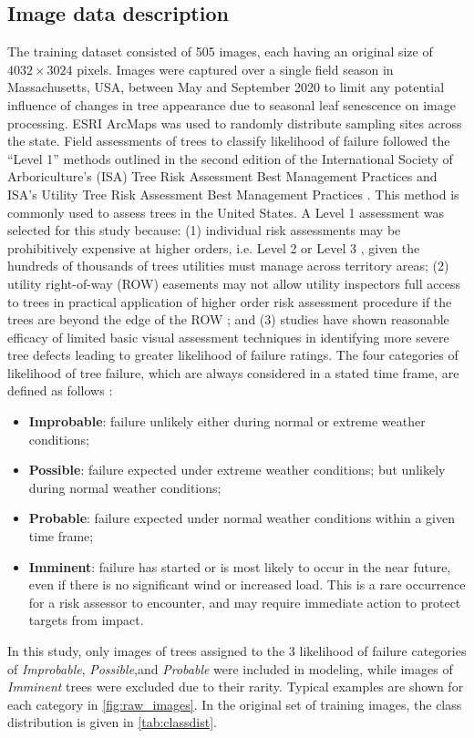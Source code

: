 \documentclass[Journal,letterpaper, SingleSpace, InsideFigs]{ascelike-new}
\begin{document}
\subsection{Image data description}
The training dataset consisted of 505 images, each having an original size of $4032\times3024$ pixels.   Images were captured over a single field season in Massachusetts, USA, between May and September 2020 to limit any potential influence of changes in tree appearance due to seasonal leaf senescence on image processing.  ESRI ArcMaps was used to randomly distribute sampling sites across the state.  Field assessments of trees to classify likelihood of failure followed the “Level 1” methods outlined in the second edition of the International Society of Arboriculture’s (ISA) Tree Risk Assessment Best Management Practices \cite{smiley2017best} and ISA’s Utility Tree Risk Assessment Best Management Practices \cite{goodfellow2020best}.  This method is commonly used to assess trees in the United States.  A Level 1 assessment was selected for this study because: (1) individual risk assessments may be prohibitively expensive at higher orders, i.e. Level 2 or Level 3 \cite{smiley2017best}, given the hundreds of thousands of trees utilities must manage across territory areas;  (2) utility right-of-way (ROW) easements may not allow utility inspectors full access to trees in practical application of higher order risk assessment procedure if the trees are beyond the edge of the ROW \cite{goodfellow2020best}; and (3) studies have shown reasonable efficacy of limited basic visual assessment techniques in identifying more severe tree defects \cite{rooney2005reliability,koeser2016frequency} leading to greater likelihood of failure ratings.  The four categories of likelihood of tree failure, which are always considered in a stated time frame, are defined as follows \cite{smiley2017best}:
\begin{itemize}
\item \textbf{Improbable}: failure unlikely either during normal or extreme weather conditions;
\item \textbf{Possible}: failure expected under extreme weather conditions; but unlikely during normal weather conditions;
\item \textbf{Probable}: failure expected under normal weather conditions within a given time frame;
\item \textbf{Imminent}: failure has started or is most likely to occur in the near future, even if there is no significant wind or increased load. This is a rare occurrence for a risk assessor to encounter, and may require immediate action to protect targets from impact.
\end{itemize}
In this study, only images of trees assigned to the 3 likelihood of failure categories of \textit{Improbable}, \textit{Possible},and \textit{Probable} were included in modeling, while images of \textit{Imminent} trees were excluded due to their rarity. Typical examples are shown for each category in \autoref{fig:raw_images}.   In the original set of training images, the class distribution is given in \autoref{tab:classdist}.
\end{document}

